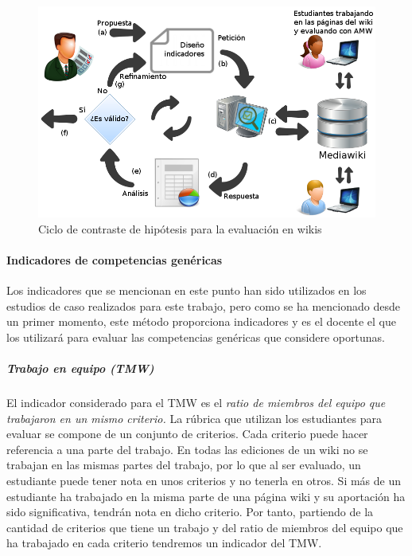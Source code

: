 \begin{figure}
  \begin{center}
    \includegraphics[scale=0.45]{AmwDiagram2.png}
  \end{center}
  \caption{Ciclo de contraste de hipótesis para la evaluación en wikis}
  \label{fig:AmwDiagram2}
\end{figure}

			\paragraph*{Indicadores de competencias genéricas}

				Los indicadores que se mencionan en este punto han sido utilizados en los estudios de caso realizados para este trabajo, pero como se ha mencionado desde un primer momento, este método proporciona indicadores y es el docente el que los utilizará para evaluar las competencias genéricas que considere oportunas.

			\subparagraph*{Trabajo en equipo (TMW)}
			El indicador considerado para el TMW es el \emph{ratio de miembros del equipo que trabajaron en un mismo criterio.} La rúbrica que utilizan los estudiantes para evaluar se compone de un conjunto de criterios. Cada criterio puede hacer referencia a una parte del trabajo. En todas las ediciones de un wiki no se trabajan en las mismas partes del trabajo, por lo que al ser evaluado, un estudiante puede tener nota en unos criterios y no tenerla en otros. Si más de un estudiante ha trabajado en la misma parte de una página wiki y su aportación ha sido significativa, tendrán nota en dicho criterio. Por tanto, partiendo de la cantidad de criterios que tiene un trabajo y del ratio de miembros del equipo que ha trabajado en cada criterio tendremos un indicador del TMW.

